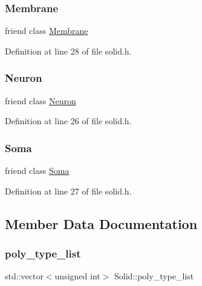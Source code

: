 \subsubsection{\texorpdfstring{Membrane}{Membrane}}
{\footnotesize\ttfamily friend class \mbox{\hyperlink{class_membrane}{Membrane}}\hspace{0.3cm}{\ttfamily [friend]}}



Definition at line 28 of file solid.\+h.

\mbox{\label{class_solid_aa410d74ba34b18a9f6bdf24323c4ee5b}} 
\subsubsection{\texorpdfstring{Neuron}{Neuron}}
{\footnotesize\ttfamily friend class \mbox{\hyperlink{class_neuron}{Neuron}}\hspace{0.3cm}{\ttfamily [friend]}}



Definition at line 26 of file solid.\+h.

\mbox{\label{class_solid_aaa07b7b364b620b9a781f30a5cd9f5ea}} 
\subsubsection{\texorpdfstring{Soma}{Soma}}
{\footnotesize\ttfamily friend class \mbox{\hyperlink{class_soma}{Soma}}\hspace{0.3cm}{\ttfamily [friend]}}



Definition at line 27 of file solid.\+h.



\subsection{Member Data Documentation}
\mbox{\label{class_solid_ad63206ff20f38b621db482b01801c4c5}} 
\subsubsection{\texorpdfstring{poly\+\_\+type\+\_\+list}{poly\_type\_list}}
{\footnotesize\ttfamily std\+::vector$<$unsigned int$>$ Solid\+::poly\+\_\+type\+\_\+list\hspace{0.3cm}{\ttfamily [protected]}}



